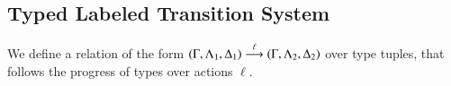 %
%

\subsection{Typed Labeled Transition System}



We define a relation of the form
$(\Gamma, \Lambda_1, \Delta_1) \stackrel{\ell}{\longrightarrow} (\Gamma, \Lambda_2, \Delta_2)$
over type tuples, that follows the progress of types over
actions $\ell$.

